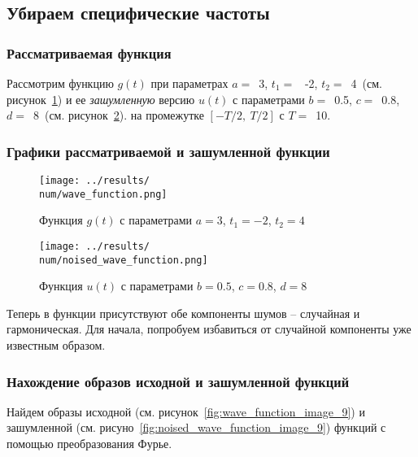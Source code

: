 \subsection{Убираем специфические частоты}

\def\num{9}
\def\a{3}
\def\from{-2}
\def\to{4}
\def\b{0.5}
\def\c{0.8}
\def\d{8}
\def\T{10}
\def\imageclip{15}

\subsubsection{Рассматриваемая функция} 

Рассмотрим функцию $g(t)$ при параметрах $a=$~\a, $t_1 =$~ \from, $t_2 =$~\to ~(см. рисунок~\ref{fig:wave_function_\num}) 
и ее \textit{зашумленную} версию $u(t)$ с параметрами $b =$~\b, $c =$~\c, $d =$~\d ~(см. рисунок~\ref{fig:noised_wave_function_\num}).
на промежутке $[-T/2,~T/2]$ с $T =$~\T.

\FloatBarrier
\subsubsection{Графики рассматриваемой и зашумленной функции}
\begin{figure}[ht!]
    \centering
    \texttt{[image: ../results/\\num/wave\_function.png]}
    \caption{Функция $g(t)$ с параметрами $a = \a$, $t_1 = \from$, $t_2 = \to$}
    \label{fig:wave_function_\num}
\end{figure}

\begin{figure}[ht!]
    \centering
    \texttt{[image: ../results/\\num/noised\_wave\_function.png]}
    \caption{Функция $u(t)$ с параметрами $b = \b$, $c = \c$, $d = \d$}
    \label{fig:noised_wave_function_\num}
\end{figure}

Теперь в функции присутствуют обе компоненты шумов -- случайная и гармоническая. Для начала, попробуем избавиться от случайной компоненты уже известным образом. 

\FloatBarrier
\subsubsection{Нахождение образов исходной и зашумленной функций}
Найдем образы исходной (см. рисунок~\ref{fig:wave_function_image_\num}) 
и зашумленной (см. рисуно~\ref{fig:noised_wave_function_image_\num}) функций с помощью преобразования Фурье. 

